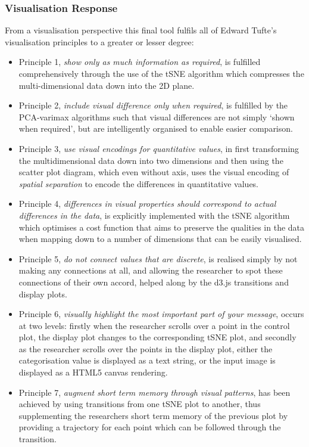 \documentclass[a4paper,11pt,titlepage]{article}
\begin{document}
	\subsubsection{Visualisation Response}
	From a visualisation perspective this final tool fulfils all of Edward Tufte's visualisation principles to a greater or lesser degree: 
	\begin{itemize}
		\item Principle 1, \textit{show only as much information as required}, is fulfilled comprehensively through the use of the tSNE algorithm which compresses the multi-dimensional data down into the 2D plane.
		\item Principle 2, \textit{include visual difference only when required}, is fulfilled by the PCA-varimax algorithms such that visual differences are not simply `shown when required', but are intelligently organised to enable easier comparison.
		\item Principle 3, \textit{use visual encodings for quantitative values}, in first transforming the multidimensional data down into two dimensions and then using the scatter plot diagram, which even without axis, uses the visual encoding of \textit{spatial separation} to encode the differences in quantitative values.
		\item Principle 4, \textit{differences in visual properties should correspond to actual differences in the data}, is explicitly implemented with the tSNE algorithm which optimises a cost function that aims to preserve the qualities in the data when mapping down to a number of dimensions that can be easily visualised. 
		\item Principle 5, \textit{do not connect values that are discrete}, is realised simply by not making any connections at all, and allowing the researcher to spot these connections of their own accord, helped along by the d3.js transitions and display plots.
		\item Principle 6, \textit{visually highlight the most important part of your message}, occurs at two levels: firstly when the researcher scrolls over a point in the control plot, the display plot changes to the corresponding tSNE plot, and secondly as the researcher scrolls over the points in the display plot, either the categorisation value is displayed as a text string, or the input image is displayed as a HTML5 canvas rendering. 
		\item Principle 7, \textit{augment short term memory through visual patterns}, has been achieved by using transitions from one tSNE plot to another, thus supplementing the researchers short term memory of the previous plot by providing a trajectory for each point which can be followed through the transition.

\end{itemize}
\end{document}
